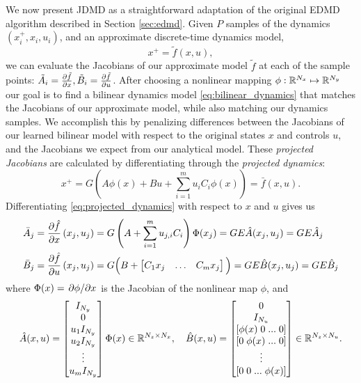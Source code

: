 \documentclass[../root.tex]{subfiles}
\begin{document}
We now present JDMD as a straightforward adaptation of the original EDMD algorithm described
in Section \ref{sec:edmd}. Given $P$ samples of the dynamics $(x_i^+, x_i, u_i)$, and an
approximate discrete-time dynamics model,
\begin{equation}
  x^+ = \tilde{f}(x,u),
\end{equation}
we can evaluate the Jacobians of our approximate model $\tilde{f}$ at each of the sample
points: $\tilde{A}_i = \pdv{\tilde{f}}{x}, \tilde{B}_i = \pdv{\tilde{f}}{u}$. After
choosing a nonlinear mapping $\phi : \mathbb{R}^{N_x} \mapsto \mathbb{R}^{N_y}$ our goal is to find a
bilinear dynamics model \eqref{eq:bilinear_dynamics} that matches the Jacobians of our
approximate model, while also matching our dynamics samples. We accomplish this by 
penalizing differences between the Jacobians of our learned bilinear model with respect to 
the original states $x$ and controls $u$, and the Jacobians we expect from our analytical 
model. These \textit{projected Jacobians} are calculated by differentiating through the 
\textit{projected dynamics}:
\begin{equation} \label{eq:projected_dynamics}
  x^+ = G \left( A \phi(x) + B u + \sum_{i=1}^m u_i C_i \phi(x) \right)  = \bar{f}(x,u).
\end{equation}
Differentiating \eqref{eq:projected_dynamics} with respect to $x$ and $u$ gives us
\begin{subequations} \label{eq:projected_jacobians}
  \begin{align}
    \bar{A}_j &= \pdv{\hat{f}}{x}\left(x_j,u_j\right) 
    = G \left(A + \sum_{i=1}^m u_{j,i} C_i \right) \Phi(x_j)
    = G E \hat{A}(x_j,u_j) = G E \hat{A}_j \\
    \bar{B}_j &= \pdv{\hat{f}}{u}\left(x_j,u_j\right) 
    = G \Big(B + \begin{bmatrix} C_1 x_j & \dots & C_m x_j \end{bmatrix} \Big)
    = G E \hat{B}(x_j,u_j) = G E \hat{B}_j
  \end{align}
\end{subequations}
where $\Phi(x) = \pdv*{\phi}{x}$ is the Jacobian of the nonlinear map $\phi$, and
\begin{equation}
  \hat{A}(x,u) =  \begin{bmatrix} 
    I_{N_y} \\ 0 \\ u_1 I_{N_y} \\ u_2 I_{N_y} \\ \vdots \\ u_m I_{N_y} 
  \end{bmatrix} \Phi(x) \in \mathbb{R}^{N_z \times N_x}, \quad
  \hat{B}(x,u) = \begin{bmatrix} 
    0 \\ 
    I_{N_u} \\ 
    [\phi(x) \; 0 \; ... \; 0] \\
    [0 \; \phi(x) \; ... \; 0] \\
    \vdots \\
    [0 \; 0 \; ... \; \phi(x)] \\
  \end{bmatrix} \in \mathbb{R}^{N_z \times N_u}.
\end{equation}
\end{document}
